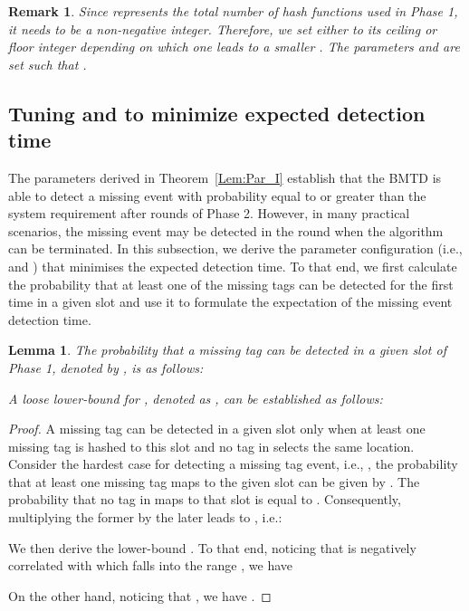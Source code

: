 \documentclass[10pt, twocolumn]{IEEEtran}
\newtheorem{lemma}{Lemma}
\newtheorem*{remark}{Remark}
\begin{document}
\begin{remark}
Since  represents the total number of hash functions used in Phase 1, it needs to be a non-negative integer. Therefore, we set  either to its ceiling or floor integer depending on which one leads to a smaller .
The parameters  and  are set such that .
\end{remark}

\subsection{Tuning  and  to minimize expected detection time}
\label{sec:parameter_global_expected}
The parameters derived in Theorem~\ref{Lem:Par_I} establish that the BMTD is able to detect a missing event with probability equal to or greater than the system requirement  after  rounds of Phase 2. However, in many practical scenarios, the missing event may be detected in the round  when the algorithm can be terminated. In this subsection, we derive the parameter configuration (i.e.,  and ) that minimises the expected detection time.
To that end, we first calculate the probability that at least one of the missing tags can be detected for the first time in a given slot and use it to formulate the expectation of the missing event detection time.

\begin{lemma}
\label{Lem:Prob_de}
The probability that a missing tag can be detected in a given slot of Phase 1, denoted by , is as follows:

A loose lower-bound for , denoted as , can be established as follows:

\end{lemma}

\begin{proof}
A missing tag can be detected in a given slot only when at least one missing tag is hashed to this slot and no tag in  selects the same location. Consider the hardest case for detecting a missing tag event, i.e., , the probability that at least one missing tag maps to the given slot can be given by . The probability that no tag in  maps to that slot is equal to . Consequently, multiplying the former by the later leads to , i.e.:

We then derive the lower-bound . To that end, noticing that  is negatively correlated with  which falls into the range , we have

On the other hand, noticing that , we have .
\end{proof}
\end{document}

